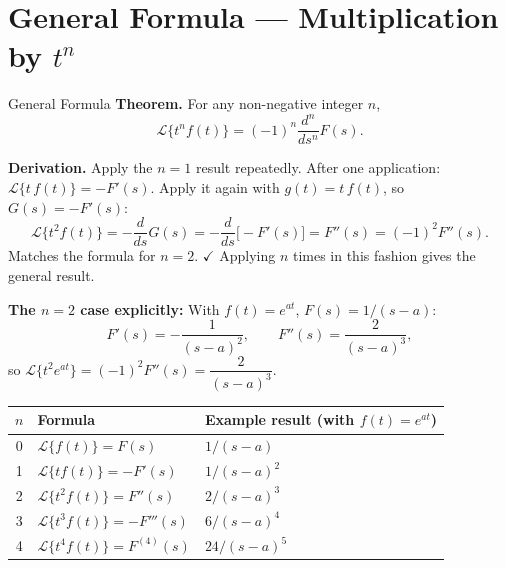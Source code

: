 \documentclass[12pt,a4paper]{article}
\begin{document}
\section{General Formula --- Multiplication by $t^n$}
\begin{infobox}{General Formula}
\textbf{Theorem.} For any non-negative integer $n$,
\[
  \mathcal{L}\{t^n f(t)\} = (-1)^n \frac{d^n}{ds^n} F(s).
\]

\textbf{Derivation.} Apply the $n=1$ result repeatedly.
After one application: $\mathcal{L}\{t\,f(t)\} = -F'(s)$.
Apply it again with $g(t)=t\,f(t)$, so $G(s)=-F'(s)$:
\[
  \mathcal{L}\{t^2 f(t)\} = -\frac{d}{ds}G(s) = -\frac{d}{ds}\bigl[-F'(s)\bigr]
  = F''(s) = (-1)^2 F''(s).
\]
Matches the formula for $n=2$. $\checkmark$
Applying $n$ times in this fashion gives the general result.

\textbf{The $n=2$ case explicitly:}
With $f(t) = e^{at}$, $F(s) = 1/(s-a)$:
\[
  F'(s) = -\frac{1}{(s-a)^2}, \qquad
  F''(s) = \frac{2}{(s-a)^3},
\]
so $\mathcal{L}\{t^2 e^{at}\} = (-1)^2 F''(s) = \dfrac{2}{(s-a)^3}$.
\end{infobox}

\medskip
\begin{center}
\begin{tabular}{@{}c l l@{}}
\toprule
$n$ & \textbf{Formula} & \textbf{Example result (with $f(t)=e^{at}$)} \\
\midrule
0 & $\mathcal{L}\{f(t)\} = F(s)$ & $1/(s-a)$ \\
1 & $\mathcal{L}\{tf(t)\} = -F'(s)$ & $1/(s-a)^2$ \\
2 & $\mathcal{L}\{t^2 f(t)\} = F''(s)$ & $2/(s-a)^3$ \\
3 & $\mathcal{L}\{t^3 f(t)\} = -F'''(s)$ & $6/(s-a)^4$ \\
4 & $\mathcal{L}\{t^4 f(t)\} = F^{(4)}(s)$ & $24/(s-a)^5$ \\
\bottomrule
\end{tabular}
\end{center}

\end{document}
